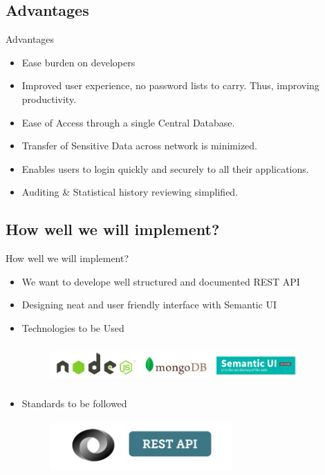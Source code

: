 \documentclass[10pt,xcolor=dvipsnames]{beamer}
\begin{document}
\subsection{Advantages}
\begin{frame}{Advantages}
\begin{itemize}
	\item Ease burden on developers
	\item Improved user experience, no password lists to carry. Thus, improving productivity.
	\item Ease of Access through a single Central Database.
	\item Transfer of Sensitive Data across network is minimized.
	\item Enables users to login quickly and securely to all their applications.
	\item Auditing \& Statistical history reviewing simplified.
\end{itemize}
\end{frame}

\subsection{How well we will implement?}
\begin{frame}{How well we will implement?}
\begin{itemize}
\item We want to develope well structured and documented REST API
\item Designing neat and user friendly interface with Semantic UI
\item Technologies to be Used
\begin{figure}
\includegraphics[width=9.5cm,height=1.5cm]{technologies}
\end{figure}
\item Standards to be followed
\begin{figure}
\includegraphics[width=7cm,height=2cm]{standards}
\end{figure}
\end{itemize}
\end{frame}
\end{document}
